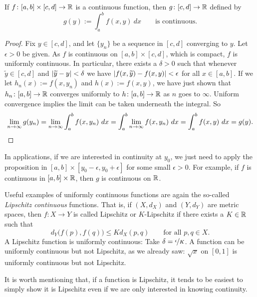 \begin{prop} \label{prop:integralcontcont}
If $f \colon [a,b] \times [c,d] \to {\mathbb{R}}$ is a continuous function,
then $g \colon [c,d] \to {\mathbb{R}}$ defined by
\begin{equation*}
g(y) := \int_a^b f(x,y) ~dx  \qquad \text{is continuous}.
\end{equation*}
\end{prop}

\begin{proof}
Fix $y \in [c,d]$, and let $\{ y_n \}$ be a sequence in $[c,d]$
converging to $y$.
Let $\epsilon > 0$ be given.
As $f$ is continuous on $[a,b] \times [c,d]$, which is compact, $f$
is uniformly continuous.  
In particular, there exists a $\delta > 0$ such that
whenever $\widetilde{y} \in [c,d]$ and
$\left\lvert {\widetilde{y}-y} \right\rvert < \delta$ we have
$\left\lvert {f(x,\widetilde{y})-f(x,y)} \right\rvert < \epsilon$ for all $x \in [a,b]$.
If we let $h_n(x):= f(x,y_n)$ and $h(x) := f(x,y)$,
we have just shown that
$h_n \colon [a,b] \to {\mathbb{R}}$ converges uniformly 
to
$h \colon [a,b] \to {\mathbb{R}}$ as $n$ goes to $\infty$.
Uniform convergence implies the limit can be taken underneath the integral.
So
\begin{equation*}
\lim_{n\to \infty}
g(y_n)
=
\lim_{n\to \infty}
\int_a^b 
f(x,y_n) ~dx 
= 
\int_a^b 
\lim_{n\to \infty}
f(x,y_n) ~dx 
= 
\int_a^b 
f(x,y) ~dx = g(y) . \qedhere
\end{equation*}
\end{proof}

In applications, if we are interested in continuity at $y_0$, we just
need to apply the proposition in $[a,b] \times [y_0-\epsilon,y_0+\epsilon]$
for some small $\epsilon > 0$.  For example, if $f$ is continuous in
$[a,b] \times {\mathbb{R}}$, then $g$ is continuous on ${\mathbb{R}}$.

\begin{example}
Useful examples of uniformly continuous functions are again the so-called
\emph{Lipschitz continuous}%
%
functions.  That is, if
$(X,d_X)$ and $(Y,d_Y)$ are metric spaces, then $f \colon X \to Y$
is called Lipschitz or $K$-Lipschitz if there exists a $K \in {\mathbb{R}}$ such that
\begin{equation*}
d_Y\bigl(f(p),f(q)\bigr) \leq K d_X(p,q)
\qquad \text{for all } p,q \in X.
\end{equation*}
A Lipschitz function is uniformly continuous:
Take $\delta = \nicefrac{\epsilon}{K}$.
A function can be uniformly continuous
but not Lipschitz,
as we already saw: $\sqrt{x}$ on $[0,1]$
is uniformly continuous but not Lipschitz.

It is worth mentioning that,
if a function is Lipschitz, it tends to be
easiest to simply show it is Lipschitz even if we are only
interested in knowing continuity.
\end{example}

